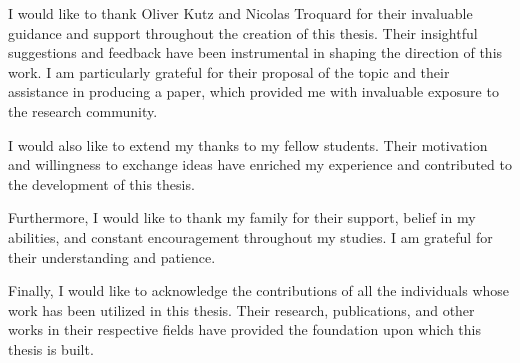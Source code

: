 I would like to thank Oliver Kutz and Nicolas Troquard for their invaluable guidance and support throughout the creation of this thesis. Their insightful suggestions and feedback have been instrumental in shaping the direction of this work. I am particularly grateful for their proposal of the topic and their assistance in producing a paper, which provided me with invaluable exposure to the research community.

I would also like to extend my thanks to my fellow students. Their motivation and willingness to exchange ideas have enriched my experience and contributed to the development of this thesis.

Furthermore, I would like to thank my family for their support, belief in my abilities, and constant encouragement throughout my studies. I am grateful for their understanding and patience.

Finally, I would like to acknowledge the contributions of all the individuals whose work has been utilized in this thesis. Their research, publications, and other works in their respective fields have provided the foundation upon which this thesis is built.
